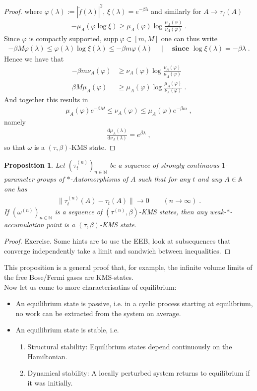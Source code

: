 \documentclass[
a4paper, %
11pt, %
onecolumn, %
openany, %
]{memoir}
\theoremstyle{definition}
\theoremstyle{remark}
\theoremstyle{plain}
\newtheorem{prop}[definition]{Proposition}
\begin{document}
\begin{proof}
where $\varphi(\lambda):=|\check{f}(\lambda)|^2$, $\xi(\lambda)=e^{-\beta\lambda}$ and similarly for $A\rightarrow \tau_f(A)$ \begin{align}
-\mu_A(\varphi\log\xi)\geq \mu_A(\varphi)\log \frac{\mu_A(\varphi)}{\nu_A(\varphi)}\;.
\end{align}
Since $\varphi$ is compactly supported, $\mathrm{supp}~\varphi\subset [m,M]$ one can thus write \begin{align}
-\beta M\varphi(\lambda)\leq \varphi(\lambda)\log\xi(\lambda)\leq -\beta m \varphi(\lambda) \quad \mid \quad \textbf{since }\log\xi(\lambda)=-\beta\lambda\;.
\end{align}
Hence we have that \begin{align}
-\beta m \nu_A(\varphi)&\geq \nu_A(\varphi)\log\frac{\nu_A(\varphi)}{\mu_A(\varphi)}\\
\beta M\mu_A(\varphi)&\geq \mu_A(\varphi)\log\frac{\mu_A(\varphi)}{\nu_A(\varphi)}\; .
\end{align}
And together this results in \begin{align}
\mu_A(\varphi)e^{-\beta M}\leq \nu_A(\varphi)\leq \mu_A(\varphi)e^{-\beta m}\; ,
\end{align}
namely \begin{align}
\frac{\mathrm{d}\mu_A(\lambda)}{\mathrm{d}\nu_A(\lambda)}=e^{\beta\lambda}\; ,
\end{align}
so that $\omega$ is a $(\tau,\beta)$-KMS state.
\end{proof}
\begin{prop}
Let $(\tau_t^{(n)})_{n\in\mathbb{N}}$ be a sequence of strongly continuous $1$-parameter groups of $*$-Automorphisms of $A$ such that for any $t$ and any $A\in\mathbb{A}$ one has \begin{align}
\|\tau_t^{(n)}(A)-\tau_t(A)\|\rightarrow 0 \qquad (n\rightarrow \infty)\; .
\end{align}
If $(\omega^{(n)})_{n\in\mathbb{N}}$ is a sequence of $(\tau^{(n)},\beta)$-KMS states, then any weak-$*$-accumulation point is a $(\tau,\beta)$-KMS state.
\end{prop}
\begin{proof}
Exercise. Some hints are to use the EEB, look at subsequences that converge independently take a limit and sandwich between inequalities. 
\end{proof}
This proposition is a general proof that, for example, the infinite volume limits of the free Bose/Fermi gases are KMS-states.\\
Now let us come to more characterisatins of equilibrium: \begin{itemize}
\item An equilibrium state is passive, i.e. in a cyclic process starting at equilibrium, no work can be extracted from the system on average.
\item An equilibrium state is stable, i.e. \begin{enumerate}
\item Structural stability: Equilibrium states depend continuously on the Hamiltonian.
\item Dynamical stability: A locally perturbed system returns to equilibrium if it was initially.
\end{enumerate}
\end{itemize}
\end{document}
